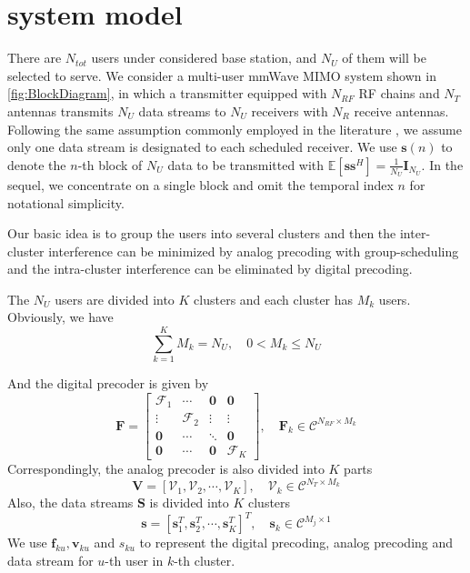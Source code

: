 \documentclass[conference]{IEEEtran}
\begin{document}
\section{system model}
There are $N_{tot}$ users under considered base station, and $N_U$ of them will be selected to serve. We consider a multi-user mmWave MIMO system shown in \figurename{ \ref{fig:BlockDiagram}}, in which a transmitter equipped with $N_{RF}$ RF chains and $N_T$ antennas transmits $N_U$ data streams to $N_U$ receivers with $N_R$ receive antennas. Following the same assumption commonly employed in the literature \cite{alkhateeb2015limited}, we assume only one data stream is designated to each scheduled receiver. We use ${\bm s}(n)$ to denote the $n$-th block of $N_U$ data to be transmitted with $\mathbb{E}\left[\bm{ss}^H\right]=\frac{1}{N_U}\bm{I}_{N_U}$. In the sequel, we concentrate on a single block and omit the temporal index $n$ for notational simplicity.

Our basic idea is to group the users into several clusters and then the inter-cluster interference can be minimized by analog precoding with group-scheduling and the intra-cluster interference can be eliminated by digital precoding.

The $N_U$ users are divided into $K$ clusters and each cluster has $M_k$ users. Obviously, we have
\begin{equation}
	\sum_{k=1}^{K} M_k = N_U, \quad 0< M_k\leq N_U
\end{equation}

And the digital precoder is given by 
\begin{equation}
\bm{F} = 
\begin{bmatrix}
\bm{\mathcal{F}}_1&\cdots & \bm{0}&\bm{0}\\
\vdots & \bm{\mathcal{F}}_2 & \vdots&\vdots \\
\bm{0}&\cdots&\ddots &\bm{0}\\
\bm{0}&\cdots & \bm{0}&\bm{\mathcal{F}}_K
\end{bmatrix}
,\quad
\bm{F}_k \in \mathcal{C}^{N_{RF}\times M_k}
\end{equation}
Correspondingly, the analog precoder is also divided into $K$ parts
\begin{equation}
	\bm{V} = \left[\bm{\mathcal{V}}_1, \bm{\mathcal{V}}_2,\cdots, \bm{\mathcal{V}}_{K}\right], \quad \bm{\mathcal{V}}_k\in \mathcal{C}^{N_T\times M_k}
\end{equation}
Also, the data streams $\bm{S}$ is divided into $K$ clusters
\begin{equation}
\bm{s} = \left[{\mathbf{s}}_1^T, {\mathbf{s}}_2^T,\cdots, \mathbf{s}_{K}^T\right]^T, \quad \mathbf{s}_k\in \mathcal{C}^{M_j\times 1}
\end{equation}
We use $\bm{f}_{ku}, \bm{v}_{ku}$ and $s_{ku}$ to represent the digital precoding, analog precoding and data stream for $u$-th user in $k$-th cluster.
\end{document}
